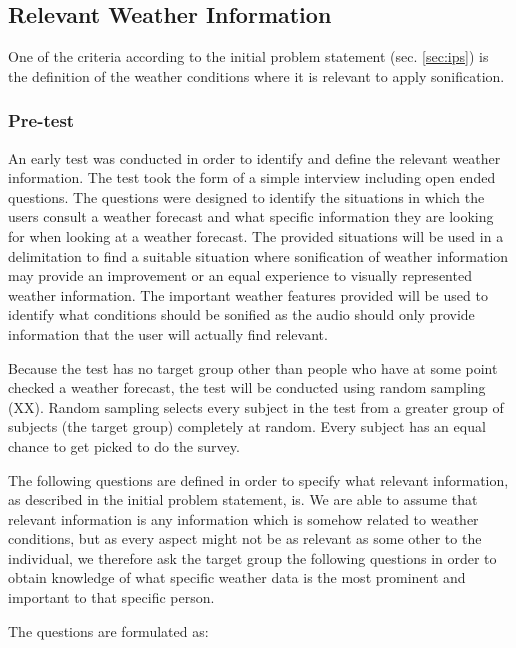 
\subsection{Relevant Weather Information} \label{sec:relevantweatherinformation}

One of the criteria according to the initial problem statement (sec. \ref{sec:ips}) is the definition of the weather conditions where it is relevant to apply sonification.


\subsubsection{Pre-test} \label{sec:pretest} 

An early test was conducted in order to identify and define the relevant weather information. 
The test took the form of a simple interview including open ended questions.
The questions were designed to identify the situations in which the users consult a weather forecast and what specific information they are looking for when looking at a weather forecast.
The provided situations will be used in a delimitation to find a suitable situation where sonification of weather information may provide an improvement or an equal experience to visually represented weather information.
The important weather features provided will be used to identify what conditions should be sonified as the audio should only provide information that the user will actually find relevant.
\bigskip

Because the test has no target group other than people who have at some point checked a weather forecast, the test will be conducted using random sampling (XX). 
Random sampling selects every subject in the test from a greater group of subjects (the target group) completely at random.
Every subject has an equal chance to get picked to do the survey.
\bigskip

The following questions are defined in order to specify what relevant information, as described in the initial problem statement, is. 
We are able to assume that relevant information is any information which is somehow related to weather conditions, but as every aspect might not be as relevant as some other to the individual, we therefore ask the target group the following questions in order to obtain knowledge of what specific weather data is the most prominent and important to that specific person.

The questions are formulated as:

